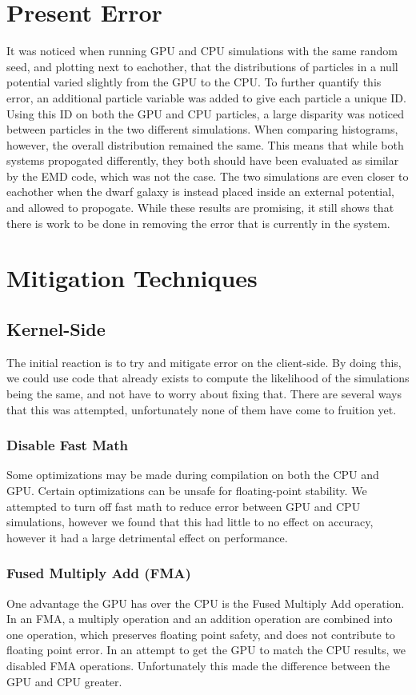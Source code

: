 \documentclass[fleqn,10pt]{SelfArx} %
\begin{document}
\section{Present Error}
    It was noticed when running GPU and CPU simulations with the same random seed, and plotting next to eachother, that the distributions of particles in a null potential varied slightly from the GPU to the CPU. To further quantify this error, an additional particle variable was added to give each particle a unique ID. Using this ID on both the GPU and CPU particles, a large disparity was noticed between particles in the two different simulations. When comparing histograms, however, the overall distribution remained the same. This means that while both systems propogated differently, they both should have been evaluated as similar by the EMD code, which was not the case. The two simulations are even closer to eachother when the dwarf galaxy is instead placed inside an external potential, and allowed to propogate. While these results are promising, it still shows that there is work to be done in removing the error that is currently in the system. 

\section{Mitigation Techniques}
    \subsection{Kernel-Side}
        The initial reaction is to try and mitigate error on the client-side. By doing this, we could use code that already exists to compute the likelihood of the simulations being the same, and not have to worry about fixing that. There are several ways that this was attempted, unfortunately none of them have come to fruition yet.

        \subsubsection{Disable Fast Math}
            Some optimizations may be made during compilation on both the CPU and GPU. Certain optimizations can be unsafe for floating-point stability. We attempted to turn off fast math to reduce error between GPU and CPU simulations, however we found that this had little to no effect on accuracy, however it had a large detrimental effect on performance.
        
        \subsubsection{Fused Multiply Add (FMA)}
            One advantage the GPU has over the CPU is the Fused Multiply Add operation. In an FMA, a multiply operation and an addition operation are combined into one operation, which preserves floating point safety, and does not contribute to floating point error. In an attempt to get the GPU to match the CPU results, we disabled FMA operations. Unfortunately this made the difference between the GPU and CPU greater.
\end{document}
